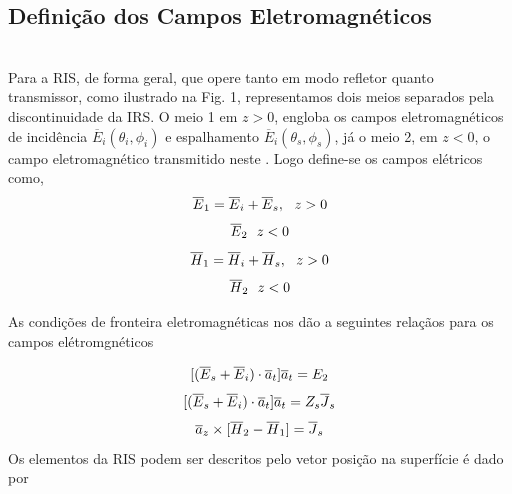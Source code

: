 \documentclass[
	12pt,				%
	openright,			%
	oneside,			%
	a4papey79r,			%
	english,			%
	brazil				%
	]{abntex2}
\begin{document}
\subsection{Definição dos Campos Eletromagnéticos}
\\
Para a RIS, de forma geral, que opere tanto em modo refletor quanto transmissor, como ilustrado na Fig. 1, representamos dois meios separados pela discontinuidade da IRS. O meio 1 em $z>0$, engloba os campos eletromagnéticos de incidência $\overline{E}_{i}(\theta_i,\phi_i)$ e espalhamento $\overline{E}_{i}(\theta_s,\phi_s)$, já o meio 2, em $z<0$, o campo eletromagnético transmitido neste . Logo define-se os campos elétricos como,\\
\begin{equation}
      \overline{E}_{1}=\overline{E}_{i}
      +\overline{E}_{s}, \ \ z > 0\\
\end{equation}
\begin{equation}
       \overline{E}_{2} \   \ z < 0 \\
\end{equation}
\begin{equation}
      \overline{H}_{1}=\overline{H}_{i}
      +\overline{H}_{s}, \ \ z > 0\\
\end{equation}
\begin{equation}
       \overline{H}_{2}\   \ z < 0 \\
\end{equation}

As condições de fronteira eletromagnéticas nos dão a seguintes relaçãos para os campos elétromgnéticos

\begin{equation}{\label{BoundaryFields}}
 [(\overline{E}_s+\overline{E}_{i})\cdot \overline{a}_t]\overline{a}_t=E_2
\end{equation}
\begin{equation}{\label{BoundaryFieldsImp}}
 [(\overline{E}_s+\overline{E}_{i})\cdot \overline{a}_t]\overline{a}_t=Z_s\overline{J}_{s}
\end{equation}
\begin{equation}{\label{BoundaryCurrent}}
  \overline{a}_z  \times [{\overline{H}_{2}-\overline{H}_{1}} ]=\overline{J}_{s}
\end{equation}
Os elementos da RIS podem ser descritos pelo vetor posição na superfície é dado por
\end{document}
